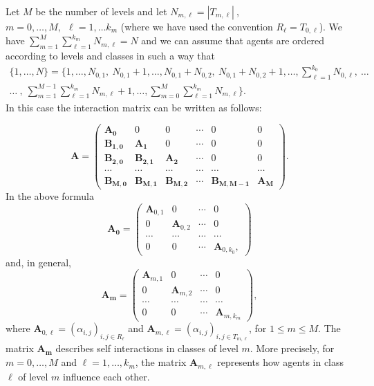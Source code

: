 \documentclass[article,12pt]{article}
\theoremstyle{plain}
\theoremstyle{definition}
\theoremstyle{remark}
\numberwithin{equation}{section}
\numberwithin{theorem}{section}
\begin{document}
		
		Let $M$ be the number of levels and let $N_{m,\ell}=|T_{m,\ell}|\ $, $m=0,\ldots , M,\ \ \ell=1,\ldots k_m$ (where we have used the convention $R_\ell=T_{0, \ell}$). We have $\sum_{m=1}^M \sum_{\ell=1}^{k_m} N_{m,\ell}=N$ and we can assume that agents are ordered according to levels and classes in such a way that \begin{multline*} 
			\{1,\ldots, N\}=
			\{1,\ldots, N_{0,1},\  N_{0,1}+1, \ldots, N_{0,1}+N_{0,2},\  N_{0, 1}+N_{0,2}+1, \ldots ,\sum_{\ell=1}^{k_{0}}N_{0,\ell},\ \ldots  \\
			\ldots\ ,\  \sum_{m=1}^{M-1}\sum_{\ell=1}^{k_{m}}N_{m,\ell}+1
			,\ldots,\sum_{m=0}^{M}\sum_{\ell=1}^{k_{m}} N_{m,\ell}\}.
		\end{multline*}  In this case the interaction matrix can be written as follows:
		
		$$ \mathbf{A}=\left(\begin{matrix}
			\mathbf{A_0} &  0  & 0 &\cdots & 0 & 0\\
			\mathbf{B_{1,0}} & \mathbf{A_1}& 0 &\cdots & 0 & 0\\
			\mathbf{B_{2,0}} & \mathbf{B_{2,1}} & \mathbf{A_2}&\cdots & 0 & 0\\
			\cdots & \cdots & \cdots & \cdots & \cdots & \cdots\\
			\mathbf{B_{M,0}} & \mathbf{B_{M,1}} & \mathbf{B_{M,2}}&\cdots &\mathbf{B_{M,M-1}} &  \mathbf{A_M}
		\end{matrix}\right).
		$$                                                              
		In the above formula 
		$$ \mathbf{A_0}=\left(\begin{matrix}
			\mathbf{A}_{0,1} &  0  & \cdots &0 \\
			0 & \mathbf{A}_{0,2}  &  \cdots &0\\
			\cdots & \cdots & \cdots & \cdots \\
			0 & 0 & \cdots & \mathbf{A}_{0,k_0},
		\end{matrix}\right)
		$$  
		and, in general, 
		$$ \mathbf{A_{m}}=\left(\begin{matrix}
			\mathbf{A}_{m,1} &  0  & \cdots &0 \\
			0 & \mathbf{A}_{m,2}  &  \cdots &0\\
			\cdots & \cdots & \cdots & \cdots \\
			0 & 0 & \cdots & \mathbf{A}_{m,k_m}
		\end{matrix}\right),
		$$      
		where $\mathbf{A}_{0,\ell}=(\alpha_{i,j})_{i, j \in R_{\ell}}$ and $  \mathbf{A}_{m, \ell}=(\alpha_{i,j})_{i, j \in T_{m, \ell}}$, for $1\leq m\leq M$.
		The matrix $\mathbf{A_m}$ describes self interactions in classes of level $m$. More precisely, 
		for $m=0,\ldots, M$ and $\ell=1,\ldots, k_m$, the matrix $\mathbf{A}_{m,\ell}$ represents how agents in class $\ell$ of level $m$ influence each other.\\ 
		
\end{document}
